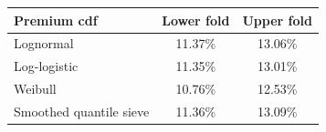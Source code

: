 \begin{tabular}{lcc}
\toprule
Premium cdf & Lower fold & Upper fold \\
\midrule
Lognormal & 11.37\% & 13.06\% \\
Log-logistic & 11.35\% & 13.01\% \\
Weibull & 10.76\% & 12.53\% \\
Smoothed quantile sieve & 11.36\% & 13.09\% \\
\bottomrule
\end{tabular}
